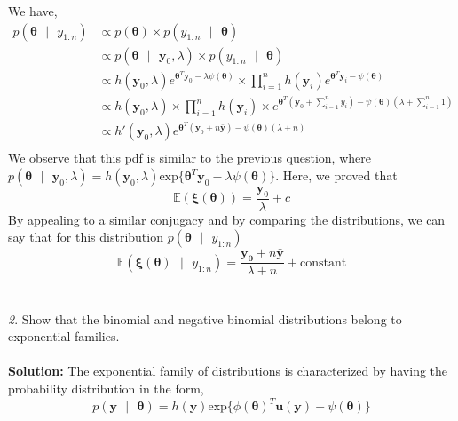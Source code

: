 \documentclass[11pt]{article}
\begin{document}
We have,
\begin{equation}
  \nonumber
  \begin{aligned}
    p(\bm{\theta} \text{ }|\text{ } y_{1:n}) & \propto p(\bm{\theta}) \times p(y_{1:n} \text{ }|\text{ } \bm{\theta})\\
    & \propto p(\bm{\theta} \text{ }| \text{ } \mathbf{y}_{0}, \lambda) \times p(y_{1:n} \text{ }|\text{ } \bm{\theta})\\
    & \propto h(\mathbf{y}_{0}, \lambda)e^{\bm{\theta}^{T}\mathbf{y}_{0} - \lambda \psi(\bm{\theta})} \times \prod_{i = 1}^{n} h(\mathbf{y}_{i})e^{\bm{\theta}^{T}\mathbf{y}_{i} - \psi(\bm{\theta})}\\
    & \propto h(\mathbf{y}_{0}, \lambda) \times \prod_{i = 1}^{n} h(\mathbf{y}_{i})\times e^{\bm{\theta}^{T}(\mathbf{y}_{0} + \sum_{i = 1}^{n}y_{i}) - \psi(\bm{\theta})(\lambda + \sum_{i = 1}^{n}1)}\\
    & \propto h'(\mathbf{y}_{0}, \lambda) e^{\bm{\theta}^{T}(\mathbf{y}_{0} + n\bar{\mathbf{y}}) - \psi(\bm{\theta})(\lambda + n)}\\
  \end{aligned}
\end{equation}
We observe that this pdf is similar to the previous question, where $p(\bm{\theta} \text{ }| \text{ } \mathbf{y}_{0}, \lambda) = h(\mathbf{y}_{0}, \lambda)\text{exp}\{\bm{\theta}^{T}\mathbf{y}_{0} - \lambda \psi(\bm{\theta})\}$. Here, we proved that
\begin{equation}
  \nonumber
  \mathbb{E}(\bm{\xi}({\bm{\theta}})) = \frac{\mathbf{y}_{0}}{\lambda} + c
\end{equation}
By appealing to a similar conjugacy and by comparing the distributions, we can say that for this distribution $p(\bm{\theta} \text{ }|\text{ } y_{1:n})$
\begin{equation}
  \nonumber
  \mathbb{E}(\bm{\xi}(\bm{\theta}) \text{ }|\text{ } y_{1:n}) = \frac{\mathbf{y_{0}} + n\bar{\mathbf{y}}}{\lambda + n} + \text{constant}
\end{equation}
\\ \\
\emph{2}. Show that the binomial and negative binomial distributions belong to exponential families.\\ \\
\textbf{Solution: }The exponential family of distributions is characterized by having the probability distribution in the form,
\begin{equation}
  \nonumber
  p(\mathbf{y} \text{ }|\text{ }\bm{\theta}) = h(\mathbf{y})\text{exp}\{\phi(\bm{\theta})^{T}\mathbf{u(y)} - \psi(\bm{\theta})\}
\end{equation}
\end{document}
